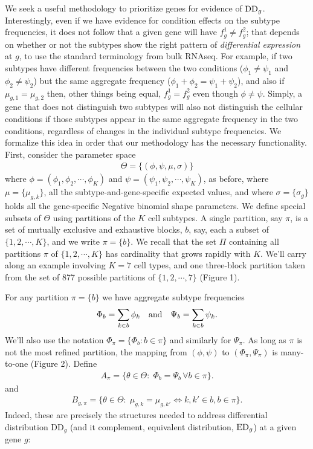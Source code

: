 \documentclass[11pt]{amsart}
\begin{document}
We seek a useful methodology to prioritize genes for evidence
of ${\rm DD}_g$.  Interestingly, even if we have evidence for condition effects
on the subtype frequencies, it does not follow that a given
gene will have $f^1_g \neq f^2_g$; that depends on whether or not the subtypes
show the right pattern of {\em differential expression} at $g$, to use the 
standard terminology from bulk RNAseq.  For example, if two subtypes have 
different frequencies between the two conditions ($\phi_1 \neq \psi_1$ and 
 $\phi_2 \neq \psi_2$) but the same aggregate frequency
($\phi_1+\phi_2 = \psi_1 + \psi_2$),  and also  if $\mu_{g,1} = \mu_{g,2}$
then, other things being equal, $f^1_g = f^2_g$ even though $\phi \neq \psi$.
Simply, a gene that does not distinguish two subtypes will also not distinguish
the cellular conditions if those subtypes appear in the same aggregate frequency
in the two conditions, regardless of changes in the individual subtype 
frequencies. We formalize this idea in order that our methodology
has the necessary functionality.  First, consider the parameter space 
\begin{eqnarray*}
\Theta = \{ (\phi, \psi,\mu, \sigma)  \}
\end{eqnarray*}
where $\phi=(\phi_1, \phi_2, \cdots, \phi_K)$ and $\psi=(\psi_1, \psi_2, \cdots, \psi_K)$,
as before, where $\mu = \{ \mu_{g,k} \}$, all the subtype-and-gene-specific expected
values, and where $\sigma = \{ \sigma_g \}$ holds all the gene-specific Negative binomial
shape parameters.  We define special subsets of $\Theta$ using
partitions of the $K$ cell subtypes.  A single partition, say $\pi$, is a set of
mutually exclusive and exhaustive blocks, $b$, say, each a subset of $\{1, 2, 
\cdots, K\}$, and we write $\pi = \{ b \}$.  We recall 
that the set $\Pi$ containing all partitions $\pi$ of $\{1,2, \cdots, K\}$
has cardinality that grows rapidly with $K$. 
 We'll carry along an example
involving $K=7$ cell types, and one three-block partition taken
from the set of 877 possible partitions of $\{1, 2, \cdots, 7\}$ (Figure 1).

For any partition $\pi=\{b\}$ we have aggregate subtype frequencies
\begin{eqnarray*}
\Phi_b = \sum_{k\in b} \phi_k \quad {\mbox {\rm  and}} \quad 
 \Psi_b = \sum_{k\in b} \psi_k.
\end{eqnarray*}
We'll also use the notation $\Phi_\pi = \{ \Phi_b: b \in \pi \}$ and similarly
for $\Psi_\pi$.   As long as $\pi$ is not the most refined partition,
the mapping from $( \phi, \psi )$ to $( \Phi_\pi, \Psi_\pi)$ is many-to-one
(Figure 2).
Define
\begin{eqnarray*}
A_\pi = \{ \theta\in \Theta: \; \Phi_b = \Psi_b  \, \forall b \in \pi \}.
\end{eqnarray*}
and
\begin{eqnarray*}
B_{g,\pi} = \{ \theta \in \Theta: \; \mu_{g,k} = \mu_{g,k'} \iff k,k' \in b, b \in \pi \}.
\end{eqnarray*}
Indeed, these are precisely the
structures needed to address differential distribution DD$_g$ (and
it complement, equivalent distribution, ${\rm ED}_g$) at a given gene
$g$: 
\end{document}
